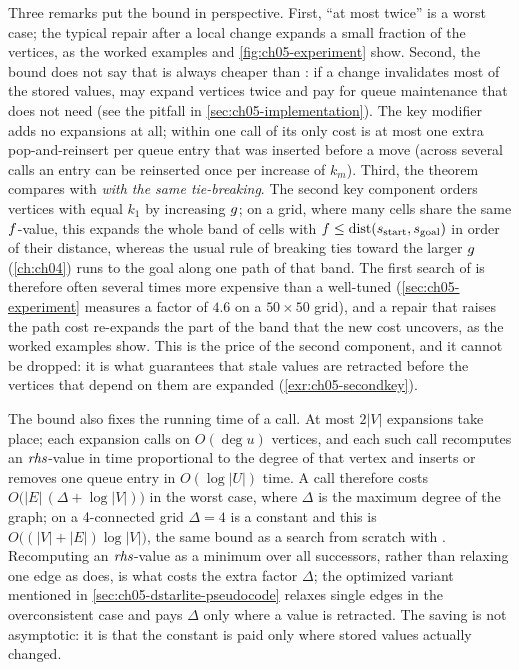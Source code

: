 Three remarks put the bound in perspective. First, ``at most twice'' is a worst case; the
typical repair after a local change expands a small fraction of the vertices, as the
worked examples and \cref{fig:ch05-experiment} show. Second, the bound does not say that
\dstarlite is always cheaper than \astar: if a change invalidates most of the stored
values, \dstarlite may expand vertices twice and pay for queue maintenance that \astar
does not need (see the pitfall in \cref{sec:ch05-implementation}). The key modifier
adds no expansions at all; within one call of \DslComputeShortestPath its only cost is
at most one extra pop-and-reinsert per queue entry that was inserted before a move
(across several calls an entry can be reinserted once per increase of $k_m$). Third, the theorem compares with \astar
\emph{with the same tie-breaking}. The second key
component orders vertices with equal $k_1$ by increasing $g$; on a grid, where many
cells share the same $f$-value, this expands the whole band of cells with
$f \le \operatorname{dist}(s_{\mathrm{start}},s_{\mathrm{goal}})$ in order of their distance,
whereas the usual \astar rule of breaking ties toward the larger $g$
(\cref{ch:ch04}) runs to the goal along one path of that band. The first search of
\dstarlite is therefore often several times more expensive than a well-tuned \astar
(\cref{sec:ch05-experiment} measures a factor of $4.6$ on a $50\times 50$ grid), and a
repair that raises the path cost re-expands the part of the band that the new cost
uncovers, as the worked examples show. This is the price of the second component, and
it cannot be dropped: it is what guarantees that stale values are retracted before the
vertices that depend on them are expanded (\cref{exr:ch05-secondkey}).

The bound also fixes the running time of a call. At most $2|V|$ expansions take place;
each expansion calls \DslUpdateVertex on $O(\deg u)$ vertices, and each such call
recomputes an $\mathit{rhs}$-value in time proportional to the degree of that vertex and
inserts or removes one queue entry in $O(\log|U|)$ time. A call therefore costs $O\bigl(|E|\,(\Delta + \log|V|)\bigr)$ in the worst
case, where $\Delta$ is the maximum degree of the graph; on
a 4-connected grid $\Delta = 4$ is a constant and this is
$O\bigl((|V|+|E|)\log|V|\bigr)$, the same bound as a search from scratch with \astar.
Recomputing an $\mathit{rhs}$-value as a minimum over all successors, rather than relaxing one
edge as \astar does, is what costs the extra factor $\Delta$; the optimized variant
mentioned in \cref{sec:ch05-dstarlite-pseudocode} relaxes single edges in the
overconsistent case and pays $\Delta$ only where a value is retracted.
The saving is not asymptotic: it is that the constant is paid only where stored values
actually changed.


